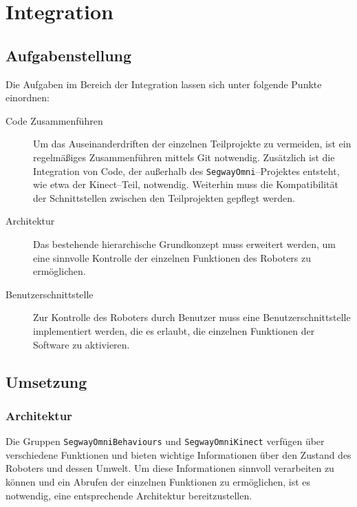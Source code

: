
\chapter{Integration}
\label{integration_cha}
\authorsection{\editorjulian}

\section{Aufgabenstellung}
\label{aufgabenstellung_integration_sec}

Die Aufgaben im Bereich der Integration lassen sich unter folgende Punkte einordnen:

\begin{description}
\item[Code Zusammenführen]
Um das Auseinanderdriften der einzelnen Teilprojekte zu vermeiden, ist ein regelmäßiges Zusammenführen 
mittels Git notwendig. Zusätzlich ist die Integration von Code, der außerhalb des \lstinline{SegwayOmni}--Projektes 
entsteht, wie etwa der Kinect--Teil, notwendig. Weiterhin muss die Kompatibilität der Schnittstellen 
zwischen den Teilprojekten gepflegt werden.

\item[Architektur]
Das bestehende hierarchische Grundkonzept muss erweitert werden, um eine sinnvolle Kontrolle der 
einzelnen Funktionen des Roboters zu ermöglichen.

\item[Benutzerschnittstelle]
Zur Kontrolle des Roboters durch Benutzer muss eine Benutzerschnittstelle implementiert werden, die es 
erlaubt, die einzelnen Funktionen der Software zu aktivieren.

\end{description}

\section{Umsetzung}
\label{umsetzung_integration_sec}

\subsection{Architektur}
\label{integration_architektur_sec}

Die Gruppen \lstinline{SegwayOmniBehaviours} und \lstinline{SegwayOmniKinect} verfügen über 
verschiedene Funktionen und bieten wichtige Informationen über den Zustand des Roboters und 
dessen Umwelt.
Um diese Informationen sinnvoll verarbeiten zu können und ein Abrufen der einzelnen 
Funktionen zu ermöglichen, ist es notwendig, eine entsprechende Architektur bereitzustellen.

